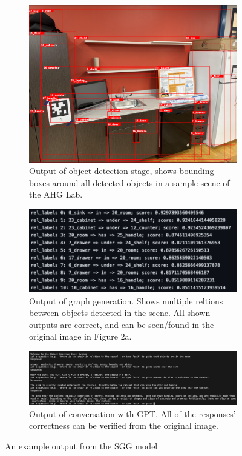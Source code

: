 \documentclass[letterpaper, 10 pt, conference]{ieeeconf}  %
\begin{document}
    \begin{figure}
        \centering
        \begin{subfigure}{0.48\textwidth}
            \centering
            \includegraphics[width=1\textwidth]{images/scene.png}
            \caption{Output of object detection stage, shows bounding boxes around all detected objects in a sample scene of the AHG Lab.}
            \label{fig:outputs}
        \end{subfigure}
        \begin{subfigure}{0.48\textwidth}
            \centering
            \includegraphics[width=1\textwidth]{images/graph.png}
            \caption{Output of graph generation. Shows multiple reltions between objects detected in the scene. All shown outputs are correct, and can be seen/found in the original image in Figure 2a.}
            \label{fig:graph}
        \end{subfigure}
        \begin{subfigure}{0.48\textwidth}
            \centering
            \includegraphics[width=1\textwidth]{images/output.png}
            \caption{Output of conversation with GPT. All of the responses' correctness can be verified from the original image.}
            \label{fig:graph}
        \end{subfigure}
        \caption{An example output from the SGG model}
        \label{fig:example}
        

\end{figure}
\end{document}
